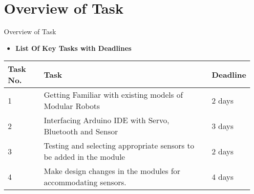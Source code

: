 \documentclass[10pt, a4paper]{beamer}
\begin{document}
\section{Overview of Task}
\begin{frame}{Overview of Task}
	\begin{itemize}
		\item \textbf{List Of Key Tasks with Deadlines} 
		
	\end{itemize}
	
	\begin{center}
    \begin{tabular}{ | l | p{5cm} | l |}
    \hline
     \textbf{Task No.} & \textbf{Task} & \textbf{Deadline}\\ \hline
     1 & Getting Familiar with existing models of Modular Robots & 2 days  \\ \hline
     
     2 & Interfacing Arduino IDE with Servo, Bluetooth and Sensor & 3 days  \\ \hline
     
     3 & Testing and selecting appropriate sensors to be added in the module & 2 days  \\ \hline
     
     4 & Make design changes in the modules for accommodating sensors.  & 4 days  \\ \hline
     
    
    
    
    \end{tabular}
\end{center}

   

	
\end{frame}
\end{document}
